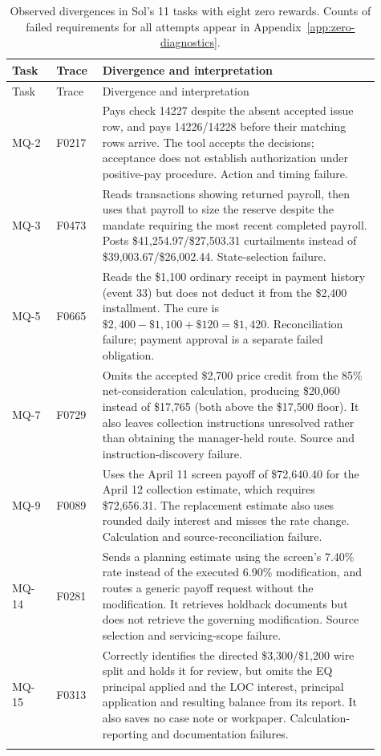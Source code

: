 {\small
\begin{longtable}{@{}p{0.11\linewidth}p{0.11\linewidth}p{0.69\linewidth}@{}}
\caption{Observed divergences in Sol's 11 tasks with eight zero rewards. Counts of failed requirements for all attempts appear in Appendix~\ref{app:zero-diagnostics}.}\label{tab:sol-zero-traces}\\
\toprule Task & Trace & Divergence and interpretation\\\midrule\endfirsthead
\toprule Task & Trace & Divergence and interpretation\\\midrule\endhead
MQ-2 & F0217 & Pays check 14227 despite the absent accepted issue row, and pays 14226/14228 before their matching rows arrive. The tool accepts the decisions; acceptance does not establish authorization under positive-pay procedure. Action and timing failure.\\\addlinespace
MQ-3 & F0473 & Reads transactions showing returned payroll, then uses that payroll to size the reserve despite the mandate requiring the most recent completed payroll. Posts \$41,254.97/\$27,503.31 curtailments instead of \$39,003.67/\$26,002.44. State-selection failure.\\\addlinespace
MQ-5 & F0665 & Reads the \$1,100 ordinary receipt in payment history (event 33) but does not deduct it from the \$2,400 installment. The cure is \(\$2{,}400-\$1{,}100+\$120=\$1{,}420\). Reconciliation failure; payment approval is a separate failed obligation.\\\addlinespace
MQ-7 & F0729 & Omits the accepted \$2,700 price credit from the 85\% net-consideration calculation, producing \$20,060 instead of \$17,765 (both above the \$17,500 floor). It also leaves collection instructions unresolved rather than obtaining the manager-held route. Source and instruction-discovery failure.\\\addlinespace
MQ-9 & F0089 & Uses the April 11 screen payoff of \$72,640.40 for the April 12 collection estimate, which requires \$72,656.31. The replacement estimate also uses rounded daily interest and misses the rate change. Calculation and source-reconciliation failure.\\\addlinespace
MQ-14 & F0281 & Sends a planning estimate using the screen's 7.40\% rate instead of the executed 6.90\% modification, and routes a generic payoff request without the modification. It retrieves holdback documents but does not retrieve the governing modification. Source selection and servicing-scope failure.\\\addlinespace
MQ-15 & F0313 & Correctly identifies the directed \$3,300/\$1,200 wire split and holds it for review, but omits the EQ principal applied and the LOC interest, principal application and resulting balance from its report. It also saves no case note or workpaper. Calculation-reporting and documentation failures.\\\addlinespace

\end{longtable}}

